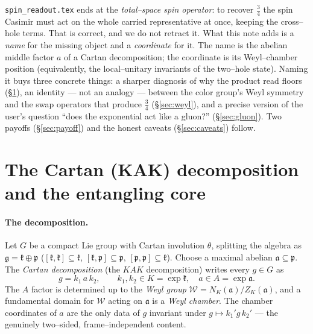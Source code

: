 \documentclass[11pt,oneside]{article}
\newcommand{\code}[1]{\texttt{#1}}
\newcommand{\Weyl}{\mathcal{W}}
\newcommand{\fk}{\mathfrak{k}}
\newcommand{\fa}{\mathfrak{a}}
\newcommand{\fp}{\mathfrak{p}}
\newcommand{\fg}{\mathfrak{g}}
\theoremstyle{plain}
\begin{document}
\code{spin\_readout.tex} ends at the \emph{total--space spin operator}: to recover
$\tfrac34$ the spin Casimir must act on the whole carried representative at once,
keeping the cross--hole terms. That is correct, and we do not retract it. What
this note adds is a \emph{name} for the missing object and a \emph{coordinate} for
it. The name is the abelian middle factor $a$ of a Cartan decomposition; the
coordinate is its Weyl--chamber position (equivalently, the local--unitary
invariants of the two--hole state). Naming it buys three concrete things: a
sharper diagnosis of why the product read floors (\S\ref{sec:kak}), an identity
--- not an analogy --- between the color group's Weyl symmetry and the swap
operators that produce $\tfrac34$ (\S\ref{sec:weyl}), and a precise version of the
user's question ``does the exponential act like a gluon?'' (\S\ref{sec:gluon}).
Two payoffs (\S\ref{sec:payoff}) and the honest caveats (\S\ref{sec:caveats})
follow.

\section{The Cartan (KAK) decomposition and the entangling core}
\label{sec:kak}

\paragraph{The decomposition.}
Let $G$ be a compact Lie group with Cartan involution $\theta$, splitting the
algebra as $\fg=\fk\oplus\fp$ ($[\fk,\fk]\subseteq\fk$, $[\fk,\fp]\subseteq\fp$,
$[\fp,\fp]\subseteq\fk$). Choose a maximal abelian $\fa\subseteq\fp$. The
\emph{Cartan decomposition} (the $KAK$ decomposition) writes every $g\in G$ as
\begin{equation}
  g = k_1\,a\,k_2, \qquad k_1,k_2\in K=\exp\fk,\quad a\in A=\exp\fa .
  \label{eq:kak}
\end{equation}
The $A$ factor is determined up to the \emph{Weyl group} $\Weyl=N_K(\fa)/Z_K(\fa)$,
and a fundamental domain for $\Weyl$ acting on $\fa$ is a \emph{Weyl chamber}. The
chamber coordinates of $a$ are the only data of $g$ invariant under
$g\mapsto k_1' g\,k_2'$ --- the genuinely two--sided, frame--independent content.
\end{document}
